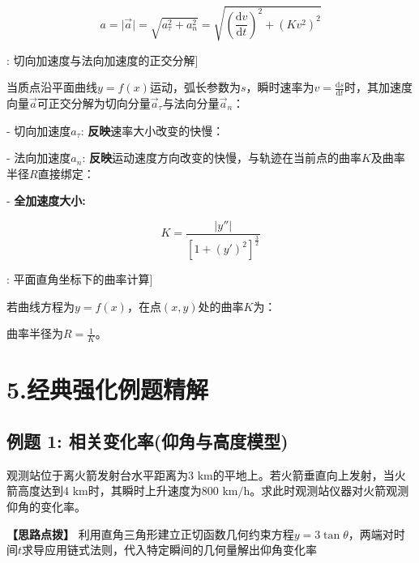 \documentclass[11pt,a4paper,UTF8]{ctexart}
\begin{document}
\begin{equation*}
a = \vert{}\vec{a}\vert{} = \sqrt{a_\tau^2 + a_n^2} = \sqrt{\left(\frac{\mathrm{d}v}{\mathrm{d}t}\right)^2 + (K v^2)^2}
\end{equation*}
\begin{thmbox}[原理[1]: 切向加速度与法向加速度的正交分解]

当质点沿平面曲线$y = f(x)$运动，弧长参数为$s$，瞬时速率为$v = \frac{\mathrm{d}s}{\mathrm{d}t}$时，其加速度向量$\vec{a}$可正交分解为切向分量$\vec{a}_\tau$与法向分量$\vec{a}_n$：


- \textit{}切向加速度$a_\tau$:\textbf{ 反映}速率大小改变的快慢\textit{}：


- \textit{}法向加速度$a_n$:\textbf{ 反映}运动速度方向改变的快慢\textit{}，与轨迹在当前点的曲率$K$及曲率半径$R$直接绑定：


- \textbf{全加速度大小:} 


\end{thmbox}

\begin{equation*}
K = \frac{\vert{}y''\vert{}}{[1 + (y')^2]^{\frac{3}{2}}}
\end{equation*}
\begin{thmbox}[原理[2]: 平面直角坐标下的曲率计算]

若曲线方程为$y = f(x)$，在点$(x, y)$处的曲率$K$为：


曲率半径为$R = \frac{1}{K}$。

\end{thmbox}

\section{5.经典强化例题精解}


\subsection{例题 1: 相关变化率(仰角与高度模型)}

观测站位于离火箭发射台水平距离为$3\text{ km}$的平地上。若火箭垂直向上发射，当火箭高度达到$4\text{ km}$时，其瞬时上升速度为$800\text{ km/h}$。求此时观测站仪器对火箭观测仰角的变化率。

\textbf{\color{DeepPurple}【思路点拨】} 利用直角三角形建立正切函数几何约束方程$y = 3\tan\theta$，两端对时间$t$求导应用链式法则，代入特定瞬间的几何量解出仰角变化率
\end{document}
